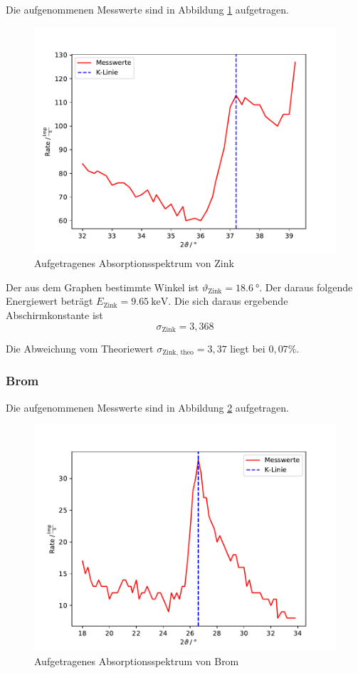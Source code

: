 Die aufgenommenen Messwerte sind in Abbildung \ref{fig:zink} aufgetragen.
\begin{figure}[H]
  \centering
  \includegraphics[width=\textwidth]{Plots/zink.pdf}
  \caption{Aufgetragenes Absorptionsspektrum von Zink}
  \label{fig:zink}
\end{figure}

Der aus dem Graphen bestimmte Winkel ist $\vartheta_\text{Zink} = \SI{18,6}{°}$. Der daraus folgende Energiewert beträgt $E_\text{Zink} = \SI{9,65}{\keV}$.
Die sich daraus ergebende Abschirmkonstante ist
\begin{equation*}
  \sigma_\text{Zink} = 3,368
\end{equation*}

Die Abweichung vom Theoriewert $\sigma_\text{Zink, theo} = 3,37$ liegt bei $0,07 \%$.

\subsubsection{Brom}

Die aufgenommenen Messwerte sind in Abbildung \ref{fig:brom} aufgetragen.
\begin{figure}[H]
  \centering
  \includegraphics[width=\textwidth]{Plots/brom.pdf}
  \caption{Aufgetragenes Absorptionsspektrum von Brom}
  \label{fig:brom}
\end{figure}

